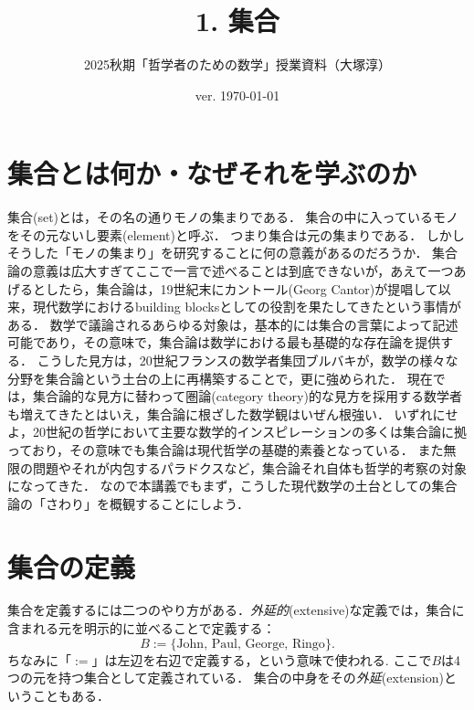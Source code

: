 \documentclass[11pt,a4paper]{jsarticle}
\begin{document}
\title{1. 集合}
\author{2025秋期「哲学者のための数学」授業資料（大塚淳）}
\date{ver. \today}
\maketitle


\section{集合とは何か・なぜそれを学ぶのか}

集合(set)とは，その名の通りモノの集まりである．
集合の中に入っているモノをその元ないし要素(element)と呼ぶ．
つまり集合は元の集まりである．
しかしそうした「モノの集まり」を研究することに何の意義があるのだろうか．
集合論の意義は広大すぎてここで一言で述べることは到底できないが，あえて一つあげるとしたら，集合論は，19世紀末にカントール(Georg Cantor)が提唱して以来，現代数学におけるbuilding blocksとしての役割を果たしてきたという事情がある．
数学で議論されるあらゆる対象は，基本的には集合の言葉によって記述可能であり，その意味で，集合論は数学における最も基礎的な存在論を提供する．
こうした見方は，20世紀フランスの数学者集団ブルバキが，数学の様々な分野を集合論という土台の上に再構築することで，更に強められた．
現在では，集合論的な見方に替わって圏論(category theory)的な見方を採用する数学者も増えてきたとはいえ，集合論に根ざした数学観はいぜん根強い．
いずれにせよ，20世紀の哲学において主要な数学的インスピレーションの多くは集合論に拠っており，その意味でも集合論は現代哲学の基礎的素養となっている．
また無限の問題やそれが内包するパラドクスなど，集合論それ自体も哲学的考察の対象になってきた．
なので本講義でもまず，こうした現代数学の土台としての集合論の「さわり」を概観することにしよう．




\section{集合の定義}

集合を定義するには二つのやり方がある．\emph{外延的}(extensive)な定義では，集合に含まれる元を明示的に並べることで定義する：
\[
 B := \{\text{John, Paul, George, Ringo}\}.
\]
ちなみに「$:=$」は左辺を右辺で定義する，という意味で使われる.
ここで$B$は4つの元を持つ集合として定義されている．
集合の中身をその\emph{外延}(extension)ということもある．
\end{document}
